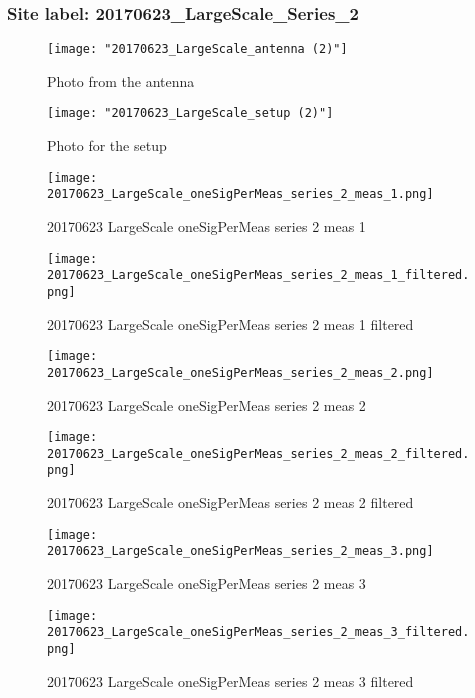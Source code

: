 \subsubsection{Site label: 20170623\_LargeScale\_Series\_2}
\begin{figure}[ht] \caption{Photo from the antenna}
\texttt{[image: "20170623\_LargeScale\_antenna (2)"]}\centering\end{figure}
\begin{figure}[ht] \caption{Photo for the setup}
\texttt{[image: "20170623\_LargeScale\_setup (2)"]}\centering\end{figure}
\begin{figure}[ht] \caption{20170623 LargeScale oneSigPerMeas series 2 meas 1}
\texttt{[image: 20170623\_LargeScale\_oneSigPerMeas\_series\_2\_meas\_1.png]}\centering\end{figure}
\begin{figure}[ht] \caption{20170623 LargeScale oneSigPerMeas series 2 meas 1 filtered}
\texttt{[image: 20170623\_LargeScale\_oneSigPerMeas\_series\_2\_meas\_1\_filtered.png]}\centering\end{figure}
\begin{figure}[ht] \caption{20170623 LargeScale oneSigPerMeas series 2 meas 2}
\texttt{[image: 20170623\_LargeScale\_oneSigPerMeas\_series\_2\_meas\_2.png]}\centering\end{figure}
\begin{figure}[ht] \caption{20170623 LargeScale oneSigPerMeas series 2 meas 2 filtered}
\texttt{[image: 20170623\_LargeScale\_oneSigPerMeas\_series\_2\_meas\_2\_filtered.png]}\centering\end{figure}
\begin{figure}[ht] \caption{20170623 LargeScale oneSigPerMeas series 2 meas 3}
\texttt{[image: 20170623\_LargeScale\_oneSigPerMeas\_series\_2\_meas\_3.png]}\centering\end{figure}
\begin{figure}[ht] \caption{20170623 LargeScale oneSigPerMeas series 2 meas 3 filtered}
\texttt{[image: 20170623\_LargeScale\_oneSigPerMeas\_series\_2\_meas\_3\_filtered.png]}\centering\end{figure}
\clearpage
